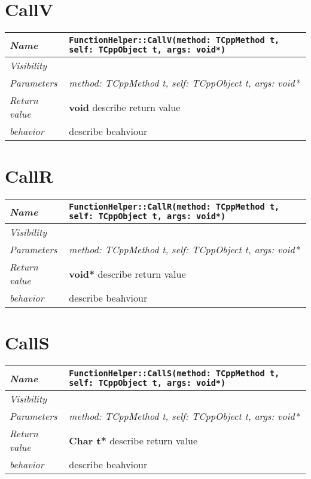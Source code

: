  \section{CallV}
\begin{longtable}{p{3cm} @{\hskip 1cm} p{12cm}}
 \hline
\textit{Name} & \texttt{FunctionHelper::CallV(method: TCppMethod t, self: TCppObject t, args: void*)}\\
\hline
 \textit{Visibility} & \\
\hline
\textit{Parameters} & \textit{method: TCppMethod t, self: TCppObject t, args: void*}\\
\hline
\textit{Return value} & \textbf{ void} describe return value\\
  \hline
 \textit{behavior} & describe beahviour \\
\hline
\end{longtable} \pagebreak
 \section{CallR}
\begin{longtable}{p{3cm} @{\hskip 1cm} p{12cm}}
 \hline
\textit{Name} & \texttt{FunctionHelper::CallR(method: TCppMethod t, self: TCppObject t, args: void*)}\\
\hline
 \textit{Visibility} & \\
\hline
\textit{Parameters} & \textit{method: TCppMethod t, self: TCppObject t, args: void*}\\
\hline
\textit{Return value} & \textbf{ void*} describe return value\\
  \hline
 \textit{behavior} & describe beahviour \\
\hline
\end{longtable} \pagebreak
 \section{CallS}
\begin{longtable}{p{3cm} @{\hskip 1cm} p{12cm}}
 \hline
\textit{Name} & \texttt{FunctionHelper::CallS(method: TCppMethod t, self: TCppObject t, args: void*)}\\
\hline
 \textit{Visibility} & \\
\hline
\textit{Parameters} & \textit{method: TCppMethod t, self: TCppObject t, args: void*}\\
\hline
\textit{Return value} & \textbf{ Char t*} describe return value\\
  \hline
 \textit{behavior} & describe beahviour \\
\hline
\end{longtable} \pagebreak
